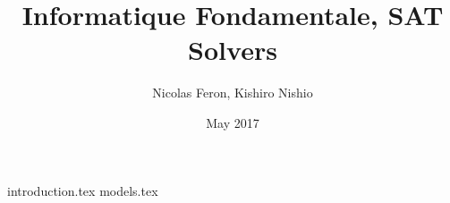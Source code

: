 \documentclass{article}
\title{Informatique Fondamentale, SAT Solvers}
\author{Nicolas Feron,  Kishiro Nishio }
\date{May 2017}
\begin{document}
\maketitle

 {introduction.tex}
\newpage
 {models.tex}
\newpage

\end{document}
